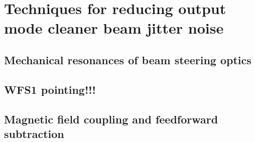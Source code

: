 \chapter{Techniques for reducing output mode cleaner beam jitter noise}

\section{Mechanical resonances of beam steering optics}

\section{WFS1 pointing!!!}

\section{Magnetic field coupling and feedforward subtraction}